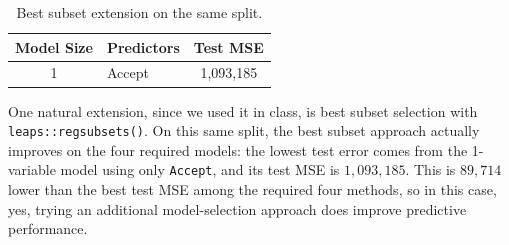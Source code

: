 \documentclass[
  10pt,
]{extarticle}
\begin{document}
\begin{table}[H]
\centering
\caption{\label{tab:unnamed-chunk-10}Best subset extension on the same split.}
\centering
\begin{tabular}[t]{c>{\raggedright\arraybackslash}p{8cm}c}
\toprule
Model Size & Predictors & Test MSE\\
\midrule
1 & Accept & 1,093,185\\
\bottomrule
\end{tabular}
\end{table}

One natural extension, since we used it in class, is best subset selection with \texttt{leaps::regsubsets()}. On this same split, the best subset approach actually improves on the four required models: the lowest test error comes from the 1-variable model using only \texttt{Accept}, and its test MSE is \(\boxed{1{,}093{,}185}\). This is \(89{,}714\) lower than the best test MSE among the required four methods, so in this case, yes, trying an additional model-selection approach does improve predictive performance.
\end{document}
